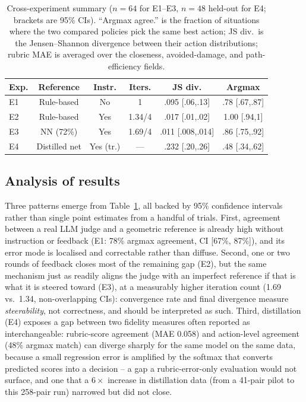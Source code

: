 \documentclass[10pt,twocolumn]{article}
\begin{document}
\begin{table}[t]
\centering
\small
\caption{Cross-experiment summary ($n=64$ for E1--E3, $n=48$ held-out
for E4; brackets are 95\% CIs). ``Argmax agree.'' is the fraction of
situations where the two compared policies pick the same best action;
JS div.\ is the Jensen--Shannon divergence between their action
distributions; rubric MAE is averaged over the closeness,
avoided-damage, and path-efficiency fields.}
\label{tab:summary}
\begin{tabular}{lccccc}
\toprule
Exp. & Reference & Instr. & Iters. & JS div. & Argmax \\
\midrule
E1 & Rule-based & No & 1 & .095 [.06,.13] & .78 [.67,.87] \\
E2 & Rule-based & Yes & 1.34/4 & .017 [.01,.02] & 1.00 [.94,1] \\
E3 & NN (72\%) & Yes & 1.69/4 & .011 [.008,.014] & .86 [.75,.92] \\
E4 & Distilled net & Yes (tr.) & --- & .232 [.20,.26] & .48 [.34,.62] \\
\bottomrule
\end{tabular}
\end{table}

\subsection{Analysis of results}
Three patterns emerge from Table~\ref{tab:summary}, all backed by 95\%
confidence intervals rather than single point estimates from a handful
of trials. First, agreement between a real LLM judge and a geometric
reference is already high without instruction or feedback (E1: 78\%
argmax agreement, CI [67\%, 87\%]), and its error mode is localised and
correctable rather than diffuse. Second, one or two rounds of feedback
closes most of the remaining gap (E2), but the same mechanism just as
readily aligns the judge with an imperfect reference if that is what it
is steered toward (E3), at a measurably higher iteration count (1.69 vs.\
1.34, non-overlapping CIs): convergence rate and final divergence
measure \emph{steerability}, not correctness, and should be interpreted
as such. Third, distillation (E4) exposes a gap between two fidelity
measures often reported as interchangeable: rubric-score agreement (MAE
0.058) and action-level agreement (48\% argmax match) can diverge
sharply for the same model on the same data, because a small regression
error is amplified by the softmax that converts predicted scores into a
decision -- a gap a rubric-error-only evaluation would not surface, and
one that a $6\times$ increase in distillation data (from a 41-pair pilot
to this 258-pair run) narrowed but did not close.
\end{document}
